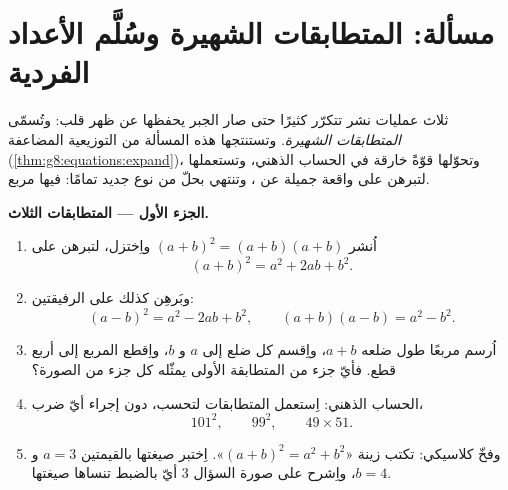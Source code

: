 \section{مسألة: المتطابقات الشهيرة وسُلَّم الأعداد
الفردية}

\begin{problem}[{مسألة نهاية الأسبوع --- $(a+b)^2$ و $(a-b)^2$
و $(a+b)(a-b)$، والمجموع $1 + 3 + 5 + \dots + (2n-1) = n^2$}]
\label{pb:g8:equations:1}
ثلاث عمليات نشر تتكرّر كثيرًا حتى صار الجبر يحفظها عن
ظهر قلب: وتُسمّى \emph{المتطابقات الشهيرة}. وتستنتجها هذه
المسألة من التوزيعية المضاعفة
(\cref{thm:g8:equations:expand})، وتحوّلها قوّةً خارقة في الحساب
الذهني، وتستعملها لتبرهن على واقعة جميلة عن ،
وتنتهي بحلّ  من نوع جديد تمامًا:  فيها
مربع.

\medskip
\noindent\textbf{الجزء الأول --- المتطابقات الثلاث.}
\begin{enumerate}
  \item اُنشر $(a + b)^2 = (a + b)(a + b)$ واِختزل، لتبرهن على
        \[
        (a + b)^2 = a^2 + 2ab + b^2 .
        \]
  \item وبَرهِن كذلك على الرفيقتين:
        \[
        (a - b)^2 = a^2 - 2ab + b^2,
        \qquad
        (a + b)(a - b) = a^2 - b^2 .
        \]
  \item اُرسم مربعًا طول ضلعه $a + b$، واِقسم كل ضلع إلى $a$
        و $b$، واِقطع المربع إلى أربع قطع. فأيّ جزء
        من المتطابقة الأولى يمثّله كل جزء من
        الصورة؟
  \item الحساب الذهني: اِستعمل المتطابقات لتحسب، دون
        إجراء أيّ ضرب،
        \[
        101^2, \qquad 99^2, \qquad 49 \times 51 .
        \]
  \item وفخّ كلاسيكي: تكتب زينة «$(a + b)^2 = a^2 + b^2$».
        اِختبر صيغتها بالقيمتين $a = 3$ و $b = 4$، واِشرح على
        صورة السؤال 3 أيّ  بالضبط تنساها
        صيغتها.
\end{enumerate}


\end{problem}

